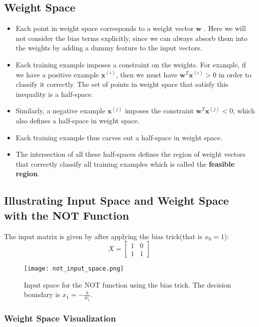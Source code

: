 \subsection{Weight Space}
\begin{itemize}
    \item Each point in weight space corresponds to a weight vector $\bm{w}$ . Here we will not consider the bias terms explicitly, since we can always absorb them into the weights by adding a dummy feature to the input vectors.
    \item Each training example imposes a constraint on the weights. For example, if we have a positive example $\bm{x}^{(i)}$, then we must have $\bm{w}^T\bm{x}^{(i)}  > 0$ in order to classify it correctly. The set of points in weight space that satisfy this inequality is a half-space.
    \item Similarly, a negative example $\bm{x}^{(j)}$ imposes the constraint $\bm{w}^T\bm{x}^{(j)} < 0$, which also defines a half-space in weight space.
    \item Each training example thus carves out a half-space in weight space.
    \item The intersection of all these half-spaces defines the region of weight vectors that correctly classify all training examples which is called the \textbf{feasible region}.
\end{itemize}


\subsection{Illustrating Input Space and Weight Space with the NOT Function}
The input matrix is given by after applying the bias trick(that is $x_{0} = 1$):
\begin{equation}
X = \begin{bmatrix}
1 & 0 \\
1 & 1
\end{bmatrix}
\end{equation}

\begin{figure}
    \centering
    \texttt{[image: not\_input\_space.png]}
    \caption{Input space for the NOT function using the bias trick. The decision boundary is $x_1 = -\frac{b}{w_1}$.}
    \label{fig:not_input_space}     
\end{figure}

\subsubsection{Weight Space Visualization}

